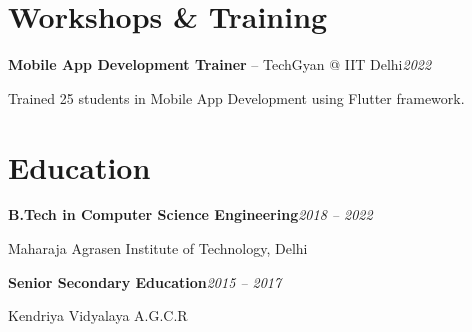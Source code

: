 \documentclass[10pt,a4paper]{article}
\newcommand{\gap}{\vspace{6.5pt}}
\begin{document}
\section{Workshops \& Training}
\textbf{\color{navy}Mobile App Development Trainer} – TechGyan @ IIT Delhi\hfill\textit{2022}\par
Trained 25 students in Mobile App Development using Flutter framework.

\section{Education}
\textbf{B.Tech in Computer Science Engineering}\hfill\textit{2018 – 2022}\par
Maharaja Agrasen Institute of Technology, Delhi\par
\gap
\textbf{Senior Secondary Education}\hfill\textit{2015 – 2017}\par
Kendriya Vidyalaya A.G.C.R
\end{document}
